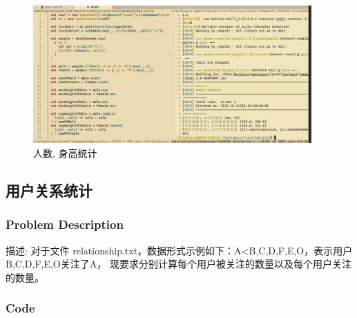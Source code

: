 \documentclass{article}
\begin{document}
    \begin{figure}[H]
      \begin{center}
        \includegraphics[width=0.95\textwidth]{./figures/3.jpg}
      \end{center}
      \caption{人数, 身高统计}
    \end{figure}

    \subsection{用户关系统计}

    \subsubsection{Problem Description}

    描述: 对于文件 relationship.txt，数据形式示例如下：A<B,C,D,F,E,O，表示用户B,C,D,F,E,O关注了A，
    现要求分别计算每个用户被关注的数量以及每个用户关注的数量。

    \subsubsection{Code}
\end{document}
